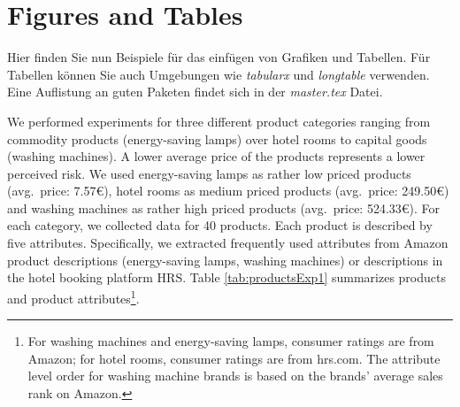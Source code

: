 \section{Figures and Tables} \label{chap:figuresTables}

Hier finden Sie nun Beispiele für das einfügen von Grafiken und Tabellen. Für Tabellen können Sie auch Umgebungen wie \emph{tabularx} und \emph{longtable} verwenden. Eine Auflistung an guten Paketen findet sich in der \emph{master.tex} Datei.

We performed experiments for three different product categories ranging from commodity products (energy-saving lamps) over hotel rooms to capital goods (washing machines). A lower average price of the products represents a lower perceived risk. We used energy-saving lamps as rather low priced products (avg.\ price: 7.57\euro), hotel rooms as medium priced products (avg.\ price: 249.50\euro) and washing machines as rather high priced products (avg.\ price: 524.33\euro). For each category, we collected data for 40 products. Each product is described by five attributes. Specifically, we extracted frequently used attributes from Amazon product descriptions (energy-saving lamps, washing machines) or descriptions in the hotel booking platform HRS. Table \ref{tab:productsExp1} summarizes products and product attributes\footnote{For washing machines and energy-saving lamps, consumer ratings are from Amazon; for hotel rooms, consumer ratings are from hrs.com. The attribute level order for washing machine brands is based on the brands' average sales rank on Amazon.}.


